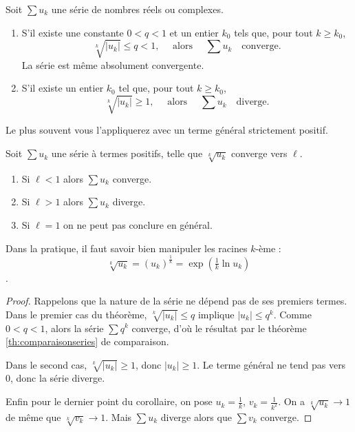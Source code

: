 \documentclass[class=report,crop=false]{standalone}
\begin{document}
\begin{theoreme}
\label{th:reglecauchy}
Soit $\sum u_k$ une série de nombres réels ou complexes.
\begin{enumerate}
\item S'il existe une constante $0<q<1$ et un entier $k_0$ tels que, pour tout
$k \ge k_0$,  
$$
\sqrt[k]{|u_k|} \le q <1,\quad \text{ alors }\quad\sum u_k\quad \text{converge.}
$$
La série est même absolument convergente.
\item S'il existe un entier $k_0$ tel que, pour tout $k \ge k_0$, 
$$
\sqrt[k]{|u_k|} \ge 1,\quad \text{ alors }\quad\sum u_k \quad\text{diverge.}
$$
\end{enumerate}
\end{theoreme}



Le plus souvent vous l'appliquerez avec un terme général strictement positif.
\begin{corollaire}
Soit $\sum u_k$ une série à termes positifs, telle que 
$\sqrt[k]{u_k}$ converge vers $\ell$.
\begin{enumerate}
\item Si $\ell<1$ alors $\sum u_k$ converge.
\item Si $\ell>1$ alors $\sum u_k$ diverge.
\item Si $\ell=1$ on ne peut pas conclure en général.
\end{enumerate}
\end{corollaire}

Dans la pratique, il faut savoir bien manipuler les racines $k$-ème : 
$$\sqrt[k]{u_k} = (u_k)^{\frac1k} = \exp\left(\tfrac1k \ln u_k\right)$$.

\begin{proof}
Rappelons que la nature de la série ne dépend pas de ses premiers
termes. Dans le premier cas du théorème, $\sqrt[k]{|u_k|} \le q$
implique  $|u_k| \le q^k$. Comme $0<q<1$, alors la série $\sum q^k$ converge, d'où le résultat
par le théorème \ref{th:comparaisonseries} de comparaison.  

Dans le second cas, $\sqrt[k]{|u_k|} \ge 1$, donc $|u_k| \ge 1$.
Le terme général ne tend pas vers $0$, donc la série diverge.  

Enfin pour le dernier point du corollaire, on pose
$u_k=\frac{1}{k}$, $v_k=\frac{1}{k^2}$.
On a $\sqrt[k]{u_k}\to 1$ de même que $\sqrt[k]{v_k}\to 1$.
Mais $\sum u_k$ diverge alors que $\sum v_k$ converge.
\end{proof}
\end{document}
